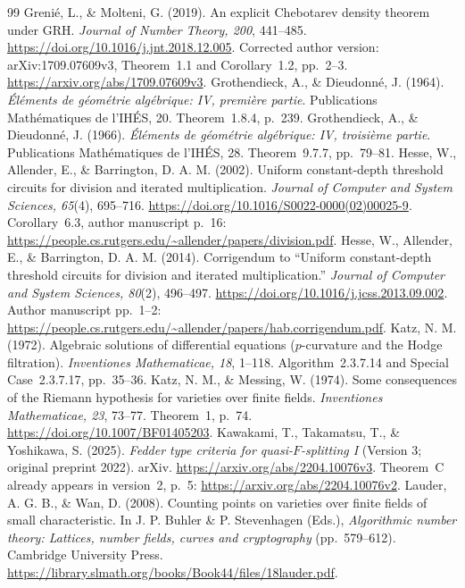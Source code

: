 \documentclass[11pt]{article}
\theoremstyle{definition}
\begin{document}
\begin{thebibliography}{99}
Greni\'e, L., \& Molteni, G. (2019).
An explicit Chebotarev density theorem under GRH.
\emph{Journal of Number Theory, 200}, 441--485.
\url{https://doi.org/10.1016/j.jnt.2018.12.005}.
Corrected author version: arXiv:1709.07609v3,
Theorem~1.1 and Corollary~1.2, pp.~2--3.
\url{https://arxiv.org/abs/1709.07609v3}.
 Grothendieck, A., \& Dieudonn\'e, J. (1964). \emph{\'El\'ements de g\'eom\'etrie alg\'ebrique: IV, premi\`ere partie}. Publications Math\'ematiques de l'IH\'ES, 20. Theorem~1.8.4, p.~239.
 Grothendieck, A., \& Dieudonn\'e, J. (1966). \emph{\'El\'ements de g\'eom\'etrie alg\'ebrique: IV, troisi\`eme partie}. Publications Math\'ematiques de l'IH\'ES, 28. Theorem~9.7.7, pp.~79--81.
 Hesse, W., Allender, E., \& Barrington, D. A. M. (2002). Uniform constant-depth threshold circuits for division and iterated multiplication. \emph{Journal of Computer and System Sciences, 65}(4), 695--716. \url{https://doi.org/10.1016/S0022-0000(02)00025-9}. Corollary~6.3, author manuscript p.~16: \url{https://people.cs.rutgers.edu/~allender/papers/division.pdf}.
 Hesse, W., Allender, E., \& Barrington, D. A. M. (2014). Corrigendum to ``Uniform constant-depth threshold circuits for division and iterated multiplication.'' \emph{Journal of Computer and System Sciences, 80}(2), 496--497. \url{https://doi.org/10.1016/j.jcss.2013.09.002}. Author manuscript pp.~1--2: \url{https://people.cs.rutgers.edu/~allender/papers/hab.corrigendum.pdf}.
 Katz, N. M. (1972). Algebraic solutions of differential equations ($p$-curvature and the Hodge filtration). \emph{Inventiones Mathematicae, 18}, 1--118. Algorithm~2.3.7.14 and Special Case~2.3.7.17, pp.~35--36.
 Katz, N. M., \& Messing, W. (1974). Some consequences of the Riemann hypothesis for varieties over finite fields. \emph{Inventiones Mathematicae, 23}, 73--77. Theorem~1, p.~74. \url{https://doi.org/10.1007/BF01405203}.
 Kawakami, T., Takamatsu, T., \& Yoshikawa, S. (2025). \emph{Fedder type criteria for quasi-$F$-splitting I} (Version 3; original preprint 2022). arXiv. \url{https://arxiv.org/abs/2204.10076v3}. Theorem~C already appears in version~2, p.~5: \url{https://arxiv.org/abs/2204.10076v2}.
 Lauder, A. G. B., \& Wan, D. (2008). Counting points on varieties over finite fields of small characteristic. In J. P. Buhler \& P. Stevenhagen (Eds.), \emph{Algorithmic number theory: Lattices, number fields, curves and cryptography} (pp.~579--612). Cambridge University Press. \url{https://library.slmath.org/books/Book44/files/18lauder.pdf}.

\end{thebibliography}
\end{document}

